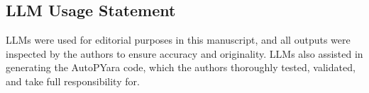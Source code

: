 \documentclass[conference,compsoc,letterpaper]{IEEEtran}
\begin{document}






















\subsection*{LLM Usage Statement}
\noindent LLMs were used for editorial purposes in this manuscript, and all outputs were inspected by the authors to ensure accuracy and originality. LLMs also assisted in generating the AutoPYara code, which the authors thoroughly tested, validated, and take full responsibility for.

%
%


\appendices



\end{document}
